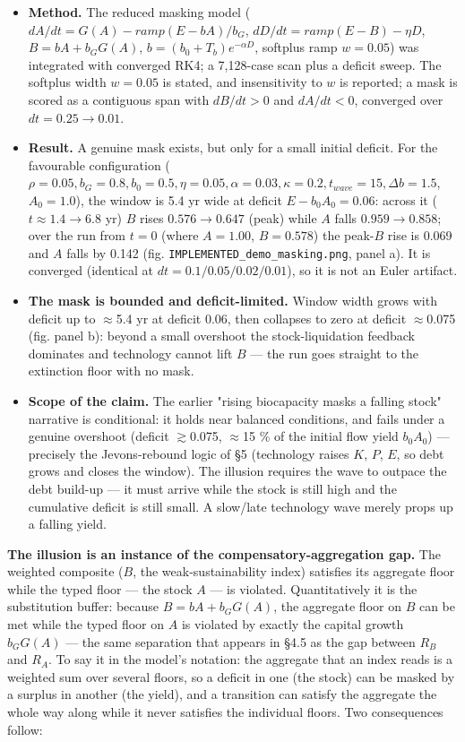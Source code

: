 \documentclass[11pt]{article}
\begin{document}
\begin{itemize}
\item \textbf{Method.} The reduced masking model ($dA/dt = G(A) - ramp(E-bA)/b_{G}$, $dD/dt = ramp(E-B) - \eta{}D$, $B = bA + b_{G} G(A)$, $b = (b_{0}+T_{b})e^{-\alpha{}D}$, softplus ramp $w=0.05$) was integrated with converged RK4; a 7,128-case scan plus a deficit sweep. The softplus width $w = 0.05$ is stated, and insensitivity to $w$ is reported; a mask is scored as a contiguous span with $dB/dt > 0$ and $dA/dt < 0$, converged over $dt = 0.25 \to{} 0.01$.
\item \textbf{Result.} A genuine mask exists, but only for a small initial deficit. For the favourable configuration ($\rho{}=0.05, b_{G}=0.8, b_{0}=0.5, \eta{}=0.05, \alpha{}=0.03, \kappa{}=0.2, t_{wave}=15, \Delta{}b=1.5$, $A_{0}=1.0$), the window is 5.4 yr wide at deficit $E - b_{0}A_{0} = 0.06$: across it ($t \approx{} 1.4 \to{} 6.8$ yr) $B$ rises $0.576 \to{} 0.647$ (peak) while $A$ falls $0.959 \to{} 0.858$; over the run from $t=0$ (where $A=1.00$, $B=0.578$) the peak-$B$ rise is 0.069 and $A$ falls by 0.142 (fig. \texttt{IMPLEMENTED\_demo\_masking.png}, panel a). It is converged (identical at $dt = 0.1/0.05/0.02/0.01$), so it is not an Euler artifact.
\item \textbf{The mask is bounded and deficit-limited.} Window width grows with deficit up to \ensuremath{\approx{}}5.4 yr at deficit 0.06, then collapses to zero at deficit \ensuremath{\approx{}}0.075 (fig. panel b): beyond a small overshoot the stock-liquidation feedback dominates and technology cannot lift $B$ — the run goes straight to the extinction floor with no mask.
\item \textbf{Scope of the claim.} The earlier "rising biocapacity masks a falling stock" narrative is conditional: it holds near balanced conditions, and fails under a genuine overshoot (deficit \ensuremath{\gtrsim{}}0.075, \ensuremath{\approx{}}15 \% of the initial flow yield $b_{0}A_{0}$) — precisely the Jevons-rebound logic of §5 (technology raises $K$, $P$, $E$, so debt grows and closes the window). The illusion requires the wave to outpace the debt build-up — it must arrive while the stock is still high and the cumulative deficit is still small. A slow/late technology wave merely props up a falling yield.
\end{itemize}

\textbf{The illusion is an instance of the compensatory-aggregation gap.} The weighted composite ($B$, the weak-sustainability index) satisfies its aggregate floor while the typed floor — the stock $A$ — is violated. Quantitatively it is the substitution buffer: because $B = bA + b_{G} G(A)$, the aggregate floor on $B$ can be met while the typed floor on $A$ is violated by exactly the capital growth $b_{G} G(A)$ — the same separation that appears in §4.5 as the gap between $R_{B}$ and $R_{A}$. To say it in the model's notation: the aggregate that an index reads is a weighted sum over several floors, so a deficit in one (the stock) can be masked by a surplus in another (the yield), and a transition can satisfy the aggregate the whole way along while it never satisfies the individual floors. Two consequences follow:
\end{document}
